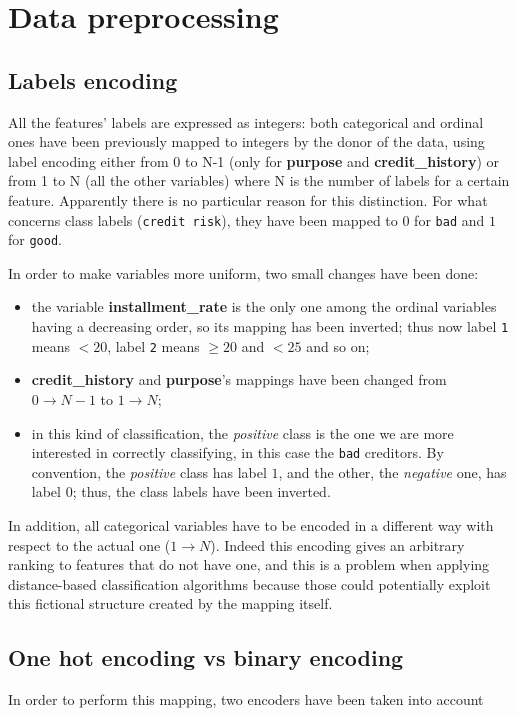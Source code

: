 \documentclass[letterpaper]{article}
\begin{document}
	\section{Data preprocessing}
	\subsection{Labels encoding}
	All the features' labels are expressed as integers: both categorical and ordinal ones have been previously mapped to integers by the donor of the data, using label encoding either from 0 to N-1 (only for \textbf{purpose} and \textbf{credit\_history}) or from 1 to N (all the other variables) where N is the number of labels for a certain feature. Apparently there is no particular reason for this distinction. For what concerns class labels (\texttt{credit risk}), they have been mapped to $0$ for \texttt{bad} and $1$ for \texttt{good}. \\
	\par In order to make variables more uniform, two small changes have been done:
	\begin{itemize}
		\item the variable \textbf{installment\_rate} is the only one among the ordinal variables having a decreasing order, so its mapping has been inverted; thus now label \texttt{1} means $< 20$, label \texttt{2} means $\geq 20$ and $< 25$ and so on;
		\item \textbf{credit\_history} and \textbf{purpose}'s mappings have been changed from $0 \rightarrow N-1$ to $1 \rightarrow N$;
		\item in this kind of classification, the \emph{positive} class is the one we are more interested in correctly classifying, in this case the \texttt{bad} creditors. By convention, the \emph{positive} class has label $1$, and the other, the \emph{negative} one, has label $0$; thus, the class labels have been inverted.
	\end{itemize}
	In addition, all categorical variables have to be encoded in a different way with respect to the actual one ($1 \rightarrow N$). Indeed this encoding gives an arbitrary ranking to features that do not have one, and this is a problem when applying distance-based classification algorithms because those could potentially exploit this fictional structure created by the mapping itself.
	\subsection{One hot encoding vs binary encoding}
	In order to perform this mapping, two encoders have been taken into account
\end{document}
